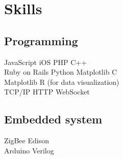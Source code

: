 \documentclass[letterpaper]{deedy-resume} %
\begin{document}
\begin{minipage}[t]{0.33\textwidth}
\sectionspace %


\section{Skills}

\subsection{Programming}

JavaScript \textbullet{} iOS \textbullet{} PHP \textbullet{} C++  \\
Ruby on Rails \textbullet{} Python \textbullet{} Matplotlib \textbullet{} C \\
Matplotlib \textbullet{} R (for data visualization) \\
TCP/IP \textbullet{} HTTP \textbullet{} WebSocket

\vspace{2mm} 

\subsection{Embedded system}
ZigBee \textbullet{} Edison \\
Arduino \textbullet{}  Verilog

\sectionspace %


\end{minipage} %
\hfill
%
%
\end{document}
